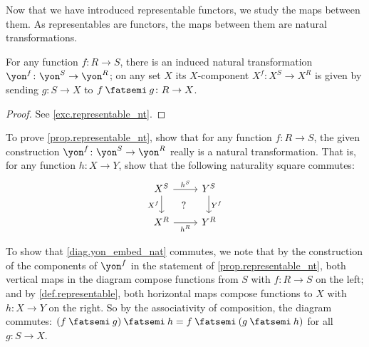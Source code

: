 \documentclass[Book-Poly]{subfiles}
\begin{document}
Now that we have introduced representable functors, we study the maps between them.
As representables are functors, the maps between them are natural transformations.

\begin{proposition}\label{prop.representable_nt}
    For any function $f\colon R\to S$, there is an induced natural transformation $\yon^f\colon\yon^S\to \yon^R$; on any set $X$ its $X$-component $X^f\colon X^S\to X^R$ is given by sending $g\colon S\to X$ to $f\then g\colon R\to X$.
\end{proposition}

\begin{proof}
    See \cref{exc.representable_nt}.
\end{proof}

\begin{exercise} \label{exc.representable_nt}
    To prove \cref{prop.representable_nt}, show that for any function $f\colon R\to S$, the given construction $\yon^f\colon\yon^S\to\yon^R$ really is a natural transformation.
    That is, for any function $h\colon X\to Y$, show that the following naturality square commutes:
    \begin{equation} \label{diag.yon_embed_nat}
        \begin{tikzcd}%
            X^S\ar[r, "h^S"]\ar[d, "X^f"']&
            Y^S\ar[d, "Y^f"]\\
            X^R\ar[r, "h^R"']&
            Y^R\ar[ul, phantom, "?"]
        \end{tikzcd}
    \end{equation}
    \qedhere

    \begin{solution}
        To show that \eqref{diag.yon_embed_nat} commutes, we note that by the construction of the components of $\yon^f$ in the statement of \cref{prop.representable_nt}, both vertical maps in the diagram compose functions from $S$ with $f \colon R \to S$ on the left; and by \cref{def.representable}, both horizontal maps compose functions to $X$ with $h \colon X \to Y$ on the right.
        So by the associativity of composition, the diagram commutes: $(f\then g)\then h=f\then(g\then h)$ for all $g\colon S\to X$.
    \end{solution}
\end{exercise}
\end{document}
